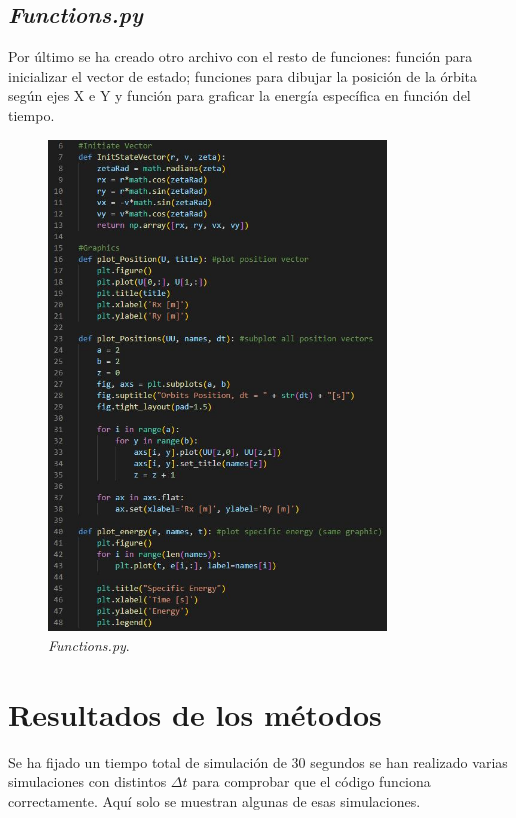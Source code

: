 \documentclass[12pt,a4paper]{article}
\begin{document}
\subsection{\textit{Functions.py}}
Por último se ha creado otro archivo con el resto de funciones: función para inicializar el vector de estado; funciones para dibujar la posición de la órbita según ejes X e Y y función para graficar la energía específica en función del tiempo.
\begin{figure}[H] 
	\centering
	\includegraphics[width=0.8\textwidth]{FIGURES/Codigo/functions.jpg}
	\caption{\textit{Functions.py}.}
\end{figure} 


\section{Resultados de los métodos}
Se ha fijado un tiempo total de simulación de 30 segundos se han realizado varias simulaciones con distintos $\Delta t$ para comprobar que el código funciona correctamente. Aquí solo se muestran algunas de esas simulaciones.
\end{document}
